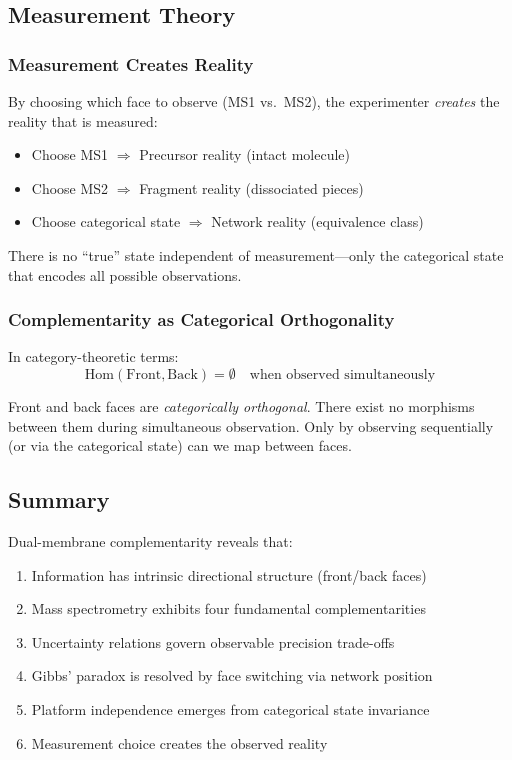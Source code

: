\documentclass[twocolumn,10pt,a4paper]{article}
\theoremstyle{definition}
\theoremstyle{remark}
\begin{document}
\subsection{Measurement Theory}

\subsubsection{Measurement Creates Reality}

By choosing which face to observe (MS1 vs.\ MS2), the experimenter \emph{creates} the reality that is measured:
\begin{itemize}
\item Choose MS1 $\Rightarrow$ Precursor reality (intact molecule)
\item Choose MS2 $\Rightarrow$ Fragment reality (dissociated pieces)
\item Choose categorical state $\Rightarrow$ Network reality (equivalence class)
\end{itemize}

There is no ``true'' state independent of measurement---only the categorical state that encodes all possible observations.

\subsubsection{Complementarity as Categorical Orthogonality}

In category-theoretic terms:
\begin{equation}
\text{Hom}(\text{Front}, \text{Back}) = \emptyset \quad \text{when observed simultaneously}
\end{equation}

Front and back faces are \emph{categorically orthogonal}. There exist no morphisms between them during simultaneous observation. Only by observing sequentially (or via the categorical state) can we map between faces.

\subsection{Summary}

Dual-membrane complementarity reveals that:
\begin{enumerate}
\item Information has intrinsic directional structure (front/back faces)
\item Mass spectrometry exhibits four fundamental complementarities
\item Uncertainty relations govern observable precision trade-offs
\item Gibbs' paradox is resolved by face switching via network position
\item Platform independence emerges from categorical state invariance
\item Measurement choice creates the observed reality
\end{enumerate}
\end{document}
